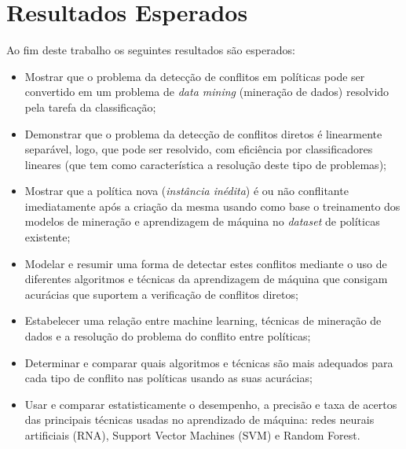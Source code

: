 \documentclass[
	12pt,				%
	openright,			%
	oneside,			%
	a4paper,			%
	english,			%
	french,				%
	spanish,			%
	brazil				%
	]{abntex2}
\begin{document}
\section{Resultados Esperados}\label{resultados_esperados}
Ao fim deste trabalho os seguintes resultados são esperados:
\begin{itemize}
	\item Mostrar que o problema da detecção de conflitos em políticas pode ser convertido em um problema de \textit{data mining} (mineração de dados) resolvido pela tarefa da classificação;
	\item Demonstrar que o problema da detecção de conflitos diretos é linearmente separável, logo, que pode ser resolvido, com eficiência por classificadores lineares (que tem como característica a resolução deste tipo de problemas);
	\item Mostrar que a política nova (\textit{instância inédita})  é ou não conflitante imediatamente após a criação da mesma usando como base o treinamento dos modelos de mineração e aprendizagem de máquina no \textit{dataset} de políticas existente;
	\item Modelar e resumir uma forma de detectar estes conflitos mediante o uso de diferentes algoritmos e técnicas da aprendizagem de máquina que consigam acurácias que suportem a verificação de conflitos diretos;
	\item Estabelecer uma relação entre machine learning, técnicas de mineração de dados e a resolução do problema do conflito entre políticas;
	\item Determinar e comparar quais algoritmos e técnicas são mais adequados para cada tipo de conflito nas políticas usando as suas acurácias;
	\item Usar e comparar estatisticamente o desempenho, a precisão e taxa de acertos das principais técnicas usadas no aprendizado de máquina: redes neurais artificiais (RNA), Support Vector Machines (SVM) e Random Forest.

\end{itemize} 
\end{document}
